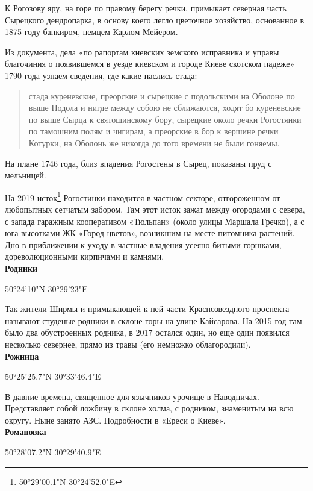 К Рогозову яру, на горе по правому берегу речки, примыкает северная часть Сырецкого дендропарка, в основу коего легло цветочное хозяйство, основанное в 1875 году банкиром, немцем Карлом Мейером.

Из документа, дела «по рапортам киевских земского исправника и управы благочиния о появившемся в уезде киевском и городе Киеве скотском падеже» 1790 года узнаем сведения, где какие паслись стада:

\begin{quotation}
стада куреневские, преорские и сырецкие с подольскими на Оболоне по выше Подола и нигде между собою не сближаются, ходят бо куреневские по выше Сырца к святошинскому бору, сырецкие около речки Рогостянки по тамошним полям и чигирам, а преорские в бор к вершине речки Котурки, на Оболонь же никогда до того времени не были гоняемы.
\end{quotation}

На плане 1746 года, близ впадения Рогостены в Сырец, показаны пруд с мельницей.

На 2019 исток\footnote{50°29'00.1"N 30°24'52.0"E} Рогостинки находится в частном секторе, отгороженном от любопытных сетчатым забором. Там этот исток зажат между огородами с севера, с запада гаражным кооперативом «Тюльпан» (около улицы Маршала Гречко), а с юга высотками ЖК «Город цветов», возникшим на месте питомника растений. Дно в приближении к уходу в частные владения усеяно битыми горшками, дореволюционными кирпичами и камнями.\\ 

\textbf{Родники}

50°24'10"N 30°29'23"E

Так жители Ширмы и примыкающей к ней части Краснозвездного проспекта называют студеные родники в склоне горы на улице Кайсарова. На 2015 год там было два обустроенных родника, в 2017 остался один, но еще один появился несколько севернее, прямо из травы (его немножко облагородили).\\

\textbf{Рожница} 

50°25'25.7"N 30°33'46.4"E

В давние времена, священное для язычников урочище в Наводничах. Представляет собой ложбину в склоне холма, с родником, знаменитым на всю округу. Ныне занято АЗС. Подробности в «Ереси о Киеве».\\

\textbf{Романовка} 

50°28'07.2"N 30°29'40.9"E

